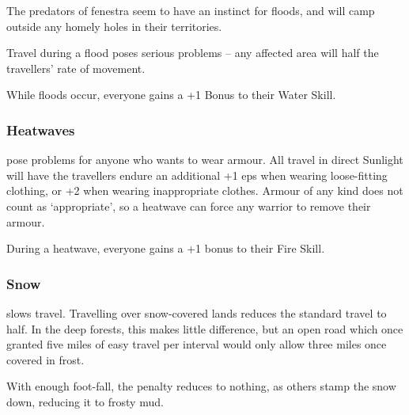 \begin{multicols}{2}
The predators of \gls{fenestra} seem to have an instinct for floods, and will camp outside any homely holes in their territories.

Travel during a flood poses serious problems -- any affected area will half the travellers' rate of movement.

While floods occur, everyone gains a +1 Bonus to their Water Skill.

\subsubsection{Heatwaves}
pose problems for anyone who wants to wear armour.
All travel in direct Sunlight will have the travellers endure an additional +1 \glspl{ep} when wearing loose-fitting clothing, or +2 when wearing inappropriate clothes.
Armour of any kind does not count as `appropriate', so a heatwave can force any warrior to remove their armour.

During a heatwave, everyone gains a +1 bonus to their Fire Skill.

\subsubsection{Snow}
slows travel.
Travelling over snow-covered lands reduces the standard travel to half.
In the deep forests, this makes little difference, but an open road which once granted five miles of easy travel per \gls{interval} would only allow three miles once covered in frost.

With enough foot-fall, the penalty reduces to nothing, as others stamp the snow down, reducing it to frosty mud.

\end{multicols}

\setcounter{diceNo}{13}
\setcounter{diceNo2}{15}
\setcounter{enc}{17}

